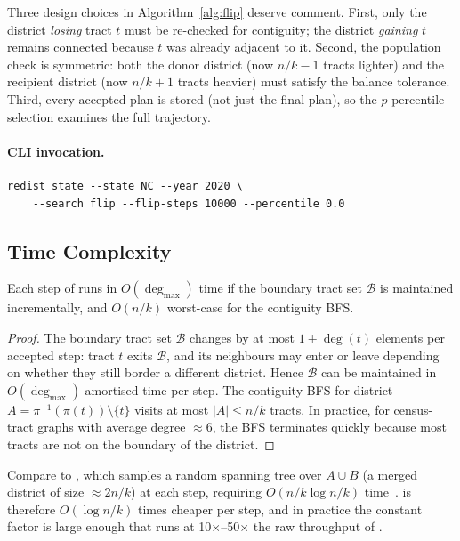 Three design choices in Algorithm~\ref{alg:flip} deserve comment.
First, only the district \emph{losing} tract $t$ must be re-checked for
contiguity; the district \emph{gaining} $t$ remains connected because $t$
was already adjacent to it.
Second, the population check is symmetric: both the donor district (now
$n/k - 1$ tracts lighter) and the recipient district (now $n/k + 1$ tracts
heavier) must satisfy the balance tolerance.
Third, every accepted plan is stored (not just the final plan), so the
$p$-percentile selection examines the full trajectory.

\paragraph{CLI invocation.}
\begin{verbatim}
redist state --state NC --year 2020 \
    --search flip --flip-steps 10000 --percentile 0.0
\end{verbatim}

\subsection{Time Complexity}

\begin{proposition}
\label{prop:o1}
Each step of \flip{} runs in $O(\deg_{\max})$ time if the boundary tract
set $\mathcal{B}$ is maintained incrementally, and $O(n/k)$ worst-case for
the contiguity BFS.
\end{proposition}

\begin{proof}
The boundary tract set $\mathcal{B}$ changes by at most $1 + \deg(t)$
elements per accepted step: tract $t$ exits $\mathcal{B}$, and its
neighbours may enter or leave depending on whether they still border a
different district.
Hence $\mathcal{B}$ can be maintained in $O(\deg_{\max})$ amortised time
per step.
The contiguity BFS for district $A = \pi^{-1}(\pi(t)) \setminus \{t\}$
visits at most $|A| \leq n/k$ tracts.
In practice, for census-tract graphs with average degree $\approx 6$,
the BFS terminates quickly because most tracts are not on the boundary
of the district.
\end{proof}

Compare to \recom{}, which samples a random spanning tree over $A \cup B$
(a merged district of size $\approx 2n/k$) at each step, requiring
$O(n/k \log n/k)$ time~\citep{deford2021}.
\flip{} is therefore $O(\log n/k)$ times cheaper per step, and in practice
the constant factor is large enough that \flip{} runs at 10$\times$--50$\times$
the raw throughput of \recom{}.

